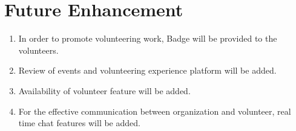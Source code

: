 \documentclass[12pt]{article}
\begin{document}
\section{Future Enhancement}
\begin{enumerate}
	\item In order to promote volunteering work, Badge will be provided to the volunteers.
	\item Review of events and volunteering experience platform will be added.
	\item Availability of volunteer feature will be added.
	\item For the effective communication between organization and volunteer, real time chat features will be added. 
\end{enumerate}
\end{document}
